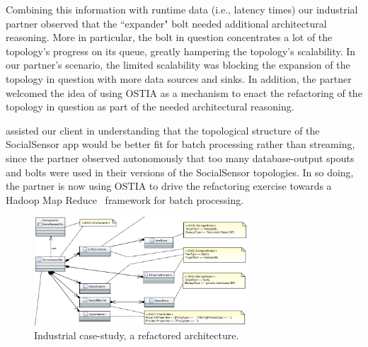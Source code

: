 Combining this
information with runtime data (i.e., latency times) our industrial partner observed
that the ``expander" bolt needed additional architectural reasoning. More in particular, the bolt in question concentrates a lot of the topology's progress on its queue, greatly hampering the topology's scalability. In our partner's scenario, the limited scalability was blocking the expansion of the topology in question with more data sources and sinks.
In addition, the partner welcomed the idea of using OSTIA as a mechanism to enact the refactoring of the topology in question as part of the needed architectural
reasoning.

assisted our client in understanding that the topological structure of the
SocialSensor app would be better fit for batch processing rather than streaming,
since the partner observed autonomously that too many database-output spouts and
bolts were used in their versions of the SocialSensor topologies. In so doing,
the partner is now using OSTIA to drive the refactoring exercise towards a
Hadoop Map Reduce~\cite{hadoop}
framework for batch processing.


\begin{figure}
\begin{center}
\includegraphics[width=8cm]{images/atc}
		\caption{Industrial case-study, a refactored architecture.}
		\label{atc}
		\end{center}
\end{figure}

